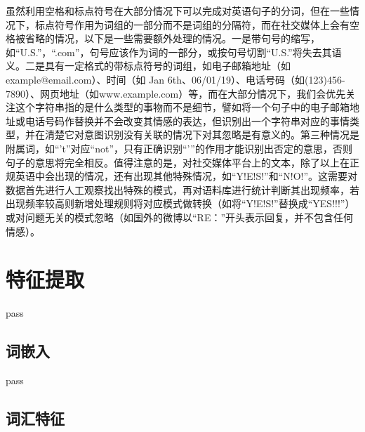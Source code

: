 虽然利用空格和标点符号在大部分情况下可以完成对英语句子的分词，但在一些情况下，标点符号作用为词组的一部分而不是词组的分隔符，而在社交媒体上会有空格被省略的情况，以下是一些需要额外处理的情况\cite{jackson2007natural}\cite{mitkov2004oxford}。一是带句号的缩写，如“U.S.”，“.com”，句号应该作为词的一部分，或按句号切割“U.S.”将失去其语义。二是具有一定格式的带标点符号的词组，如电子邮箱地址（如example@email.com）、时间（如 Jan 6th、06/01/19）、电话号码（如(123)456-7890）、网页地址（如www.example.com）等，而在大部分情况下，我们会优先关注这个字符串指的是什么类型的事物而不是细节，譬如将一个句子中的电子邮箱地址或电话号码作替换并不会改变其情感的表达，但识别出一个字符串对应的事情类型，并在清楚它对意图识别没有关联的情况下对其忽略是有意义的。第三种情况是附属词，如“'t”对应“not”，只有正确识别“'”的作用才能识别出否定的意思，否则句子的意思将完全相反。值得注意的是，对社交媒体平台上的文本，除了以上在正规英语中会出现的情况，还有出现其他特殊情况，如“Y!E!S!”和“N!O!”。这需要对数据首先进行人工观察找出特殊的模式，再对语料库进行统计判断其出现频率，若出现频率较高则新增处理规则将对应模式做转换（如将“Y!E!S!”替换成“YES!!!”）或对问题无关的模式忽略（如国外的微博以“RE：”开头表示回复，并不包含任何情感）。

\subsection{}

\subsection{}


\section{特征提取}

pass

\subsection{词嵌入}

pass

\subsection{词汇特征} %


